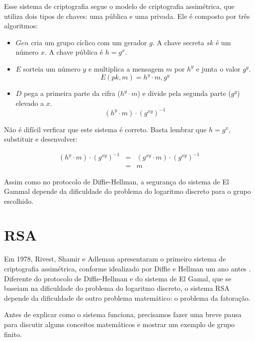 Esse sistema de criptografia segue o modelo de criptografia assimétrica, que utiliza dois tipos de chaves: uma pública e uma privada.
Ele é composto por três algoritmos:

\begin{itemize}
\item[] $Gen$ cria um grupo cíclico com um gerador $g$.
  A chave secreta $sk$ é um número $x$.
  A chave pública é $h = g^x$.
\item[] $E$ sorteia um número $y$ e multiplica a mensagem $m$ por $h^y$ e junta o valor $g^y$.
  \begin{displaymath}
    E(pk, m) = h^y \cdot m, g^y
  \end{displaymath}
\item[] $D$ pega a primeira parte da cifra ($h^y \cdot m$) e divide pela segunda parte ($g^y$) elevado a $x$.
  \begin{displaymath}
    (h^y \cdot m) \cdot (g^{xy})^{-1}
  \end{displaymath}
\end{itemize}

Não é difícil verficar que este sistema é correto.
Basta lembrar que $h = g^x$, substituir e desenvolver:

\begin{eqnarray*}
  (h^y \cdot m) \cdot (g^{xy})^{-1} & = & (g^{xy} \cdot m) \cdot (g^{xy})^{-1}\\
                                  & = & m
\end{eqnarray*}

Assim como no protocolo de Diffie-Hellman, a segurança do sistema de El Gammal depende da dificuldade do problema do logaritmo discreto para o grupo escolhido.

\section{RSA}
\label{sec:rsa}

Em 1978, Rivest, Shamir e Adleman apresentaram o primeiro sistema de criptografia assimétrica, conforme idealizado por Diffie e Hellman um ano antes \cite{Rivest78}.
Diferente do protocolo de Diffie-Hellman e do sistema de El Gamal, que se baseiam na dificuldade do problema do logaritmo discreto, o sistema RSA depende da dificuldade de outro problema matemático: o problema da fatoração.

Antes de explicar como o sistema funciona, precisamos fazer uma breve pausa para discutir alguns conceitos matemáticos e mostrar um exemplo de grupo finito.

